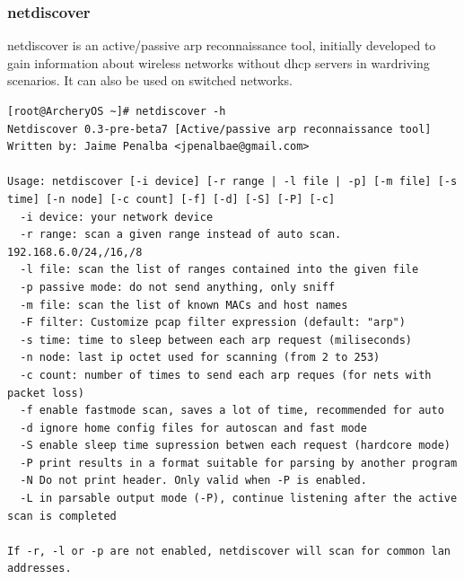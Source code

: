 \documentclass{article}
\begin{document}
\subsubsection{netdiscover}
netdiscover  is  an  active/passive  arp  reconnaissance  tool,  initially  developed to gain information about wireless networks without dhcp servers in wardriving scenarios. It can also be used on switched networks.
\begin{lstlisting}
[root@ArcheryOS ~]# netdiscover -h
Netdiscover 0.3-pre-beta7 [Active/passive arp reconnaissance tool]
Written by: Jaime Penalba <jpenalbae@gmail.com>

Usage: netdiscover [-i device] [-r range | -l file | -p] [-m file] [-s time] [-n node] [-c count] [-f] [-d] [-S] [-P] [-c]
  -i device: your network device
  -r range: scan a given range instead of auto scan. 192.168.6.0/24,/16,/8
  -l file: scan the list of ranges contained into the given file
  -p passive mode: do not send anything, only sniff
  -m file: scan the list of known MACs and host names
  -F filter: Customize pcap filter expression (default: "arp")
  -s time: time to sleep between each arp request (miliseconds)
  -n node: last ip octet used for scanning (from 2 to 253)
  -c count: number of times to send each arp reques (for nets with packet loss)
  -f enable fastmode scan, saves a lot of time, recommended for auto
  -d ignore home config files for autoscan and fast mode
  -S enable sleep time supression betwen each request (hardcore mode)
  -P print results in a format suitable for parsing by another program
  -N Do not print header. Only valid when -P is enabled.
  -L in parsable output mode (-P), continue listening after the active scan is completed

If -r, -l or -p are not enabled, netdiscover will scan for common lan addresses.
\end{lstlisting}
\end{document}
